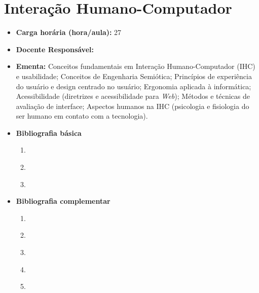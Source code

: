 \documentclass[
	10pt,				%
	openright,			%
	twoside,			%
	a4paper,			%
	english,			%
	french,				%
	brazil,				%
	sumario=tradicional
]{abntex2}
\begin{document}
\section*{Interação Humano-Computador}\label{4_ihc}
\begin{itemize}
	\item \textbf{Carga horária (hora/aula):} 27
	\item \textbf{Docente Responsável:}
	\item \textbf{Ementa:} 
	Conceitos fundamentais em Interação Humano-Computador (IHC) e usabilidade;
	Conceitos de Engenharia Semiótica;
	Princípios de experiência do usuário e design centrado no usuário;
	Ergonomia aplicada à informática;
	Acessibilidade (diretrizes e acessibilidade para \textit{Web});
	Métodos e técnicas de avaliação de interface;
	Aspectos humanos na IHC (psicologia e fisiologia do ser humano em contato com a tecnologia).
	\item \textbf{Bibliografia básica}
	\begin{enumerate}
		\item \cite{nielsen2007}
		\item \cite{Peirce2010}
		\item \cite{castells2003}
	\end{enumerate}
	\item \textbf{Bibliografia complementar}
	\begin{enumerate}
		\item \cite{audrei2009}
		\item \cite{hogan2011}
		\item \cite{steven2001}
		\item \cite{guerin2001}
		\item \cite{sommerville2011engenharia}
	\end{enumerate} 
\end{itemize}

\newpage
\end{document}
